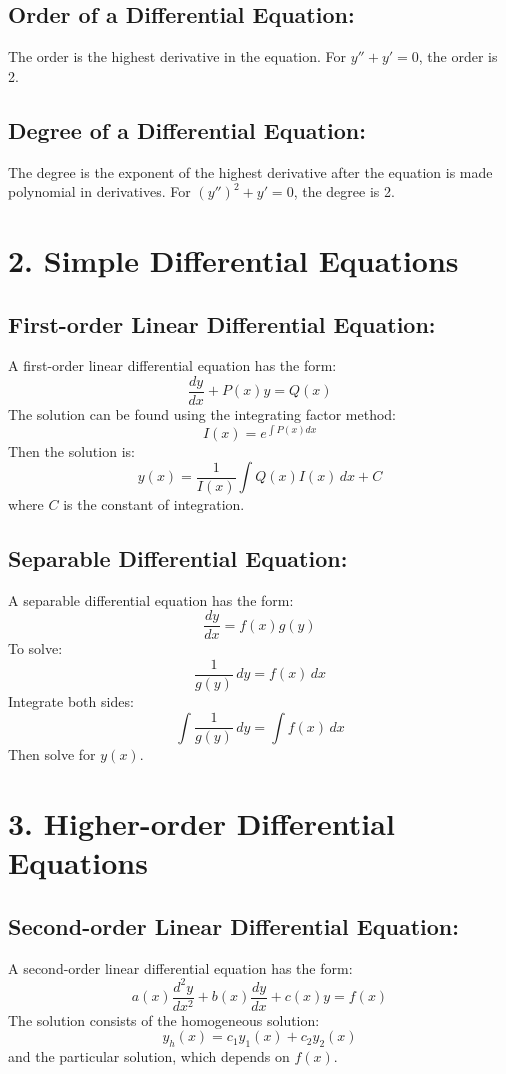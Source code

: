 \documentclass[../Main.tex]{subfiles}
\begin{document}
\subsection*{Order of a Differential Equation:}
The order is the highest derivative in the equation.
For \( y'' + y' = 0 \), the order is 2.

\subsection*{Degree of a Differential Equation:}
The degree is the exponent of the highest derivative after the equation is made polynomial in derivatives.
For \( (y'')^2 + y' = 0 \), the degree is 2.

\section*{2. Simple Differential Equations}

\subsection*{First-order Linear Differential Equation:}
A first-order linear differential equation has the form:
\[
\frac{dy}{dx} + P(x)y = Q(x)
\]
The solution can be found using the integrating factor method:
\[
I(x) = e^{\int P(x)dx}
\]
Then the solution is:
\[
y(x) = \frac{1}{I(x)} \int Q(x) I(x) \, dx + C
\]
where \( C \) is the constant of integration.

\subsection*{Separable Differential Equation:}
A separable differential equation has the form:
\[
\frac{dy}{dx} = f(x)g(y)
\]
To solve:
\[
\frac{1}{g(y)} \, dy = f(x) \, dx
\]
Integrate both sides:
\[
\int \frac{1}{g(y)} \, dy = \int f(x) \, dx
\]
Then solve for \( y(x) \).

\section*{3. Higher-order Differential Equations}

\subsection*{Second-order Linear Differential Equation:}
A second-order linear differential equation has the form:
\[
a(x) \frac{d^2y}{dx^2} + b(x) \frac{dy}{dx} + c(x) y = f(x)
\]
The solution consists of the homogeneous solution:
\[
y_h(x) = c_1 y_1(x) + c_2 y_2(x)
\]
and the particular solution, which depends on \( f(x) \).
\end{document}
